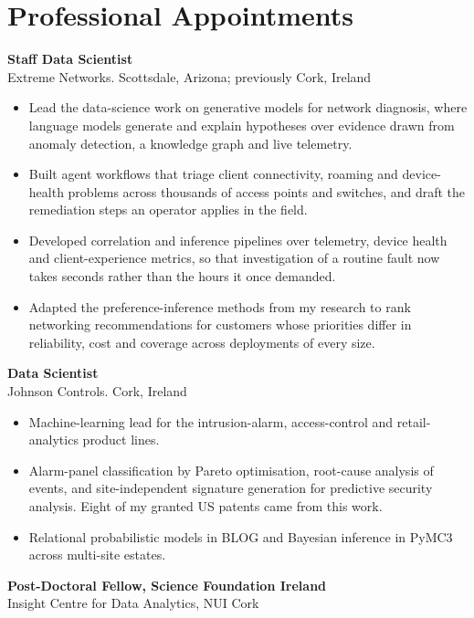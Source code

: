 \documentclass[9pt,letterpaper]{extarticle}
\newlength{\gutter}\setlength{\gutter}{0.78in}
\newenvironment{dated}[1][4pt]
  {\begin{list}{}{%
      \setlength{\labelwidth}{\gutter}
      \setlength{\labelsep}{0.16in}
      \setlength{\leftmargin}{\dimexpr\gutter+0.16in\relax}
      \setlength{\itemsep}{#1}
      \setlength{\parsep}{0pt}
      \setlength{\topsep}{3pt}
      \renewcommand{\makelabel}[1]{\raggedright\small\color{soft}##1\hfill}}}
  {\end{list}}
\newcommand{\role}[2]{{\normalsize\bfseries #1}\\[1.5pt]{\color{accent}#2}}
\newenvironment{duties}
  {\begin{itemize}[leftmargin=11pt, topsep=3pt, itemsep=3.4pt,
                   parsep=0pt, label={\color{accent}\rule[2.2pt]{4pt}{0.6pt}}]}
  {\end{itemize}}
\begin{document}
\section{Professional Appointments}
\begin{dated}
  \item[Since 2020]
    \role{Staff Data Scientist}{Extreme Networks. Scottsdale, Arizona; previously Cork, Ireland}
    \begin{duties}
      \item Lead the data-science work on generative models for network diagnosis, where language models
            generate and explain hypotheses over evidence drawn from anomaly detection, a knowledge graph and
            live telemetry.
      \item Built agent workflows that triage client connectivity, roaming and device-health problems across
            thousands of access points and switches, and draft the remediation steps an operator applies in the
            field.
      \item Developed correlation and inference pipelines over telemetry, device health and client-experience
            metrics, so that investigation of a routine fault now takes seconds rather than the hours it once demanded.
      \item Adapted the preference-inference methods from my research to rank networking recommendations for
            customers whose priorities differ in reliability, cost and coverage across deployments of every
            size.
    \end{duties}
  \item[2017--2020]
    \role{Data Scientist}{Johnson Controls. Cork, Ireland}
    \begin{duties}
      \item Machine-learning lead for the intrusion-alarm, access-control and retail-analytics product lines.
      \item Alarm-panel classification by Pareto optimisation, root-cause analysis of events, and
            site-independent signature generation for predictive security analysis. Eight of my granted US
            patents came from this work.
      \item Relational probabilistic models in BLOG and Bayesian inference in PyMC3 across multi-site estates.
    \end{duties}
  \item[2014--2017]
    \role{Post-Doctoral Fellow, Science Foundation Ireland}
         {Insight Centre for Data Analytics, NUI Cork}

\end{dated}
\end{document}
